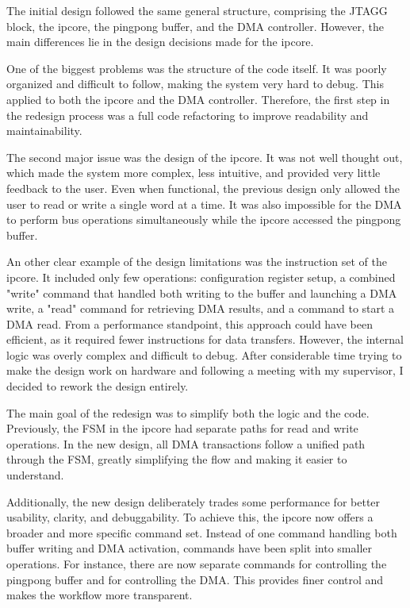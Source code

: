 \documentclass[a4paper,11pt,oneside]{report}
\begin{document}
The initial design followed the same general structure, comprising the JTAGG block, the ipcore, the pingpong buffer, and the DMA controller.  
However, the main differences lie in the design decisions made for the ipcore.

One of the biggest problems was the structure of the code itself. It was poorly organized and difficult to follow, making the system very hard to debug.  
This applied to both the ipcore and the DMA controller.  
Therefore, the first step in the redesign process was a full code refactoring to improve readability and maintainability.

The second major issue was the design of the ipcore.  
It was not well thought out, which made the system more complex, less intuitive, and provided very little feedback to the user.  
Even when functional, the previous design only allowed the user to read or write a single word at a time.  
It was also impossible for the DMA to perform bus operations simultaneously while the ipcore accessed the pingpong buffer.

An other clear example of the design limitations was the instruction set of the ipcore.  
It included only few operations: configuration register setup, a combined "write" command that handled both writing to the buffer and launching a DMA write,  
a "read" command for retrieving DMA results, and a command to start a DMA read.  
From a performance standpoint, this approach could have been efficient, as it required fewer instructions for data transfers.  
However, the internal logic was overly complex and difficult to debug.  
After considerable time trying to make the design work on hardware and following a meeting with my supervisor, I decided to rework the design entirely.

The main goal of the redesign was to simplify both the logic and the code.  
Previously, the FSM in the ipcore had separate paths for read and write operations.  
In the new design, all DMA transactions follow a unified path through the FSM, greatly simplifying the flow and making it easier to understand.

Additionally, the new design deliberately trades some performance for better usability, clarity, and debuggability.  
To achieve this, the ipcore now offers a broader and more specific command set.  
Instead of one command handling both buffer writing and DMA activation, commands have been split into smaller operations.  
For instance, there are now separate commands for controlling the pingpong buffer and for controlling the DMA.  
This provides finer control and makes the workflow more transparent.
\end{document}
